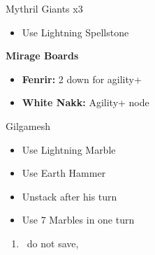 \begin{battle}[]{Mythril Giants x3}
    \begin{itemize}
        \item Use Lightning Spellstone
    \end{itemize}
\end{battle}
\begin{menu}
\textbf{Mirage Boards}
    \begin{itemize}
        \item \textbf{Fenrir:} 2 down for agility+
        \item \textbf{White Nakk:} Agility+ node
    \end{itemize}
\end{menu}
\begin{battle}[]{Gilgamesh}
    \begin{itemize}
        \item Use Lightning Marble
        \item Use Earth Hammer 
        \item Unstack after his turn
        \item Use 7 Marbles in one turn
    \end{itemize}
\end{battle}
\begin{enumerate}[resume]
    \item \cs\, do not save, \cs\
\end{enumerate}